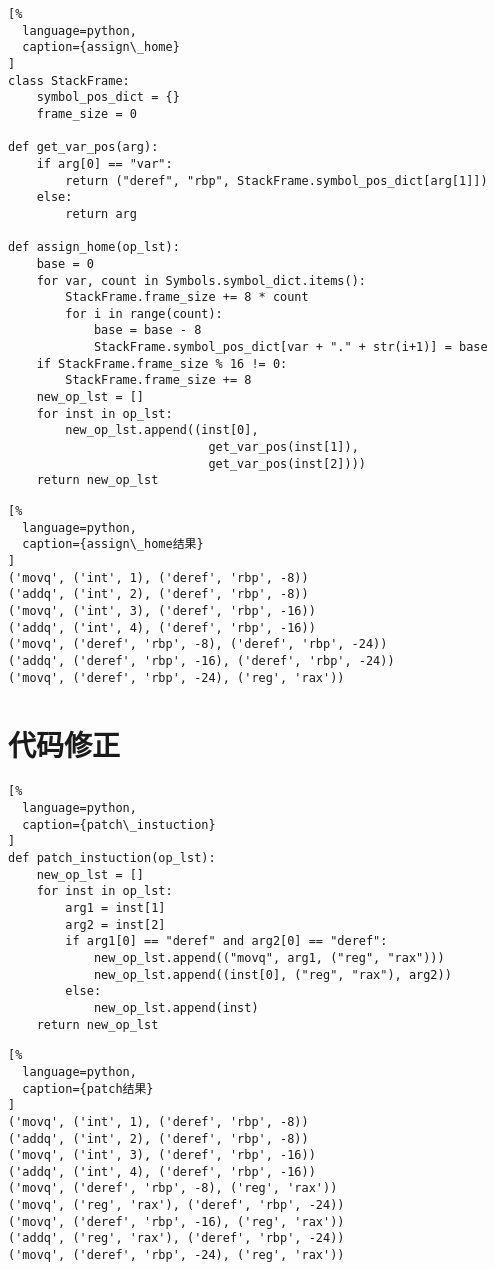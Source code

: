 \begin{lstlisting}[%
  language=python,
  caption={assign\_home}
]
class StackFrame:
    symbol_pos_dict = {}
    frame_size = 0

def get_var_pos(arg):
    if arg[0] == "var":
        return ("deref", "rbp", StackFrame.symbol_pos_dict[arg[1]])
    else:
        return arg

def assign_home(op_lst):
    base = 0
    for var, count in Symbols.symbol_dict.items():
        StackFrame.frame_size += 8 * count
        for i in range(count):
            base = base - 8
            StackFrame.symbol_pos_dict[var + "." + str(i+1)] = base
    if StackFrame.frame_size % 16 != 0:
        StackFrame.frame_size += 8
    new_op_lst = []
    for inst in op_lst:
        new_op_lst.append((inst[0], 
                            get_var_pos(inst[1]), 
                            get_var_pos(inst[2])))
    return new_op_lst
\end{lstlisting}

\begin{lstlisting}[%
  language=python,
  caption={assign\_home结果}
]
('movq', ('int', 1), ('deref', 'rbp', -8))
('addq', ('int', 2), ('deref', 'rbp', -8))
('movq', ('int', 3), ('deref', 'rbp', -16))
('addq', ('int', 4), ('deref', 'rbp', -16))
('movq', ('deref', 'rbp', -8), ('deref', 'rbp', -24))
('addq', ('deref', 'rbp', -16), ('deref', 'rbp', -24))
('movq', ('deref', 'rbp', -24), ('reg', 'rax'))
\end{lstlisting}

\section{代码修正}

\begin{lstlisting}[%
  language=python,
  caption={patch\_instuction}
]
def patch_instuction(op_lst):
    new_op_lst = []
    for inst in op_lst:
        arg1 = inst[1]
        arg2 = inst[2]
        if arg1[0] == "deref" and arg2[0] == "deref":
            new_op_lst.append(("movq", arg1, ("reg", "rax")))
            new_op_lst.append((inst[0], ("reg", "rax"), arg2))
        else:
            new_op_lst.append(inst)
    return new_op_lst
\end{lstlisting}

\begin{lstlisting}[%
  language=python,
  caption={patch结果}
]
('movq', ('int', 1), ('deref', 'rbp', -8))
('addq', ('int', 2), ('deref', 'rbp', -8))
('movq', ('int', 3), ('deref', 'rbp', -16))
('addq', ('int', 4), ('deref', 'rbp', -16))
('movq', ('deref', 'rbp', -8), ('reg', 'rax'))
('movq', ('reg', 'rax'), ('deref', 'rbp', -24))
('movq', ('deref', 'rbp', -16), ('reg', 'rax'))
('addq', ('reg', 'rax'), ('deref', 'rbp', -24))
('movq', ('deref', 'rbp', -24), ('reg', 'rax'))
\end{lstlisting}

